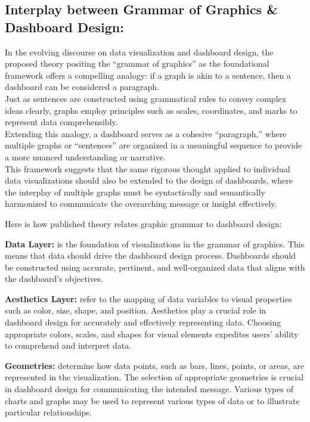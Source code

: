 \documentclass[print]{nuthesis}
\begin{document}
\hypertarget{interplay-between-grammar-of-graphics-dashboard-design}{%
\subsection{Interplay between Grammar of Graphics \& Dashboard Design:}\label{interplay-between-grammar-of-graphics-dashboard-design}}

In the evolving discourse on data visualization and dashboard design, the proposed theory positing the ``grammar of graphics'' as the foundational framework offers a compelling analogy: if a graph is akin to a sentence, then a dashboard can be considered a paragraph.\\
Just as sentences are constructed using grammatical rules to convey complex ideas clearly, graphs employ principles such as scales, coordinates, and marks to represent data comprehensibly.\\
Extending this analogy, a dashboard serves as a cohesive ``paragraph,'' where multiple graphs or ``sentences'' are organized in a meaningful sequence to provide a more nuanced understanding or narrative.\\
This framework suggests that the same rigorous thought applied to individual data visualizations should also be extended to the design of dashboards, where the interplay of multiple graphs must be syntactically and semantically harmonized to communicate the overarching message or insight effectively.

Here is how published theory relates graphic grammar to dashboard design:

\textbf{Data Layer:} is the foundation of visualizations in the grammar of graphics.
This means that data should drive the dashboard design process.
Dashboards should be constructed using accurate, pertinent, and well-organized data that aligns with the dashboard's objectives.

\textbf{Aesthetics Layer:} refer to the mapping of data variables to visual properties such as color, size, shape, and position.
Aesthetics play a crucial role in dashboard design for accurately and effectively representing data.
Choosing appropriate colors, scales, and shapes for visual elements expedites users' ability to comprehend and interpret data.

\textbf{Geometries:} determine how data points, such as bars, lines, points, or areas, are represented in the visualization.
The selection of appropriate geometries is crucial in dashboard design for communicating the intended message.
Various types of charts and graphs may be used to represent various types of data or to illustrate particular relationships.
\end{document}
